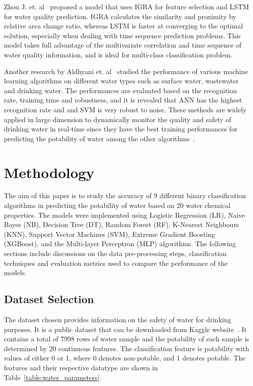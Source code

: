 \documentclass[conference]{IEEEtran}
\begin{document}
Zhou J. et. al~\cite{zhou2018water} proposed a model that uses IGRA for feature selection and LSTM for water quality prediction. IGRA calculates the similarity and proximity by relative area change ratio, whereas LSTM is faster at converging to the optimal solution, especially when dealing with time sequence prediction problems. This model takes full advantage of the multivariate correlation and time sequence of water quality information, and is ideal for multi-class classification problem. 

Another research by Aldhyani et. al~\cite{aldhyani2020water} studied the performance of various machine learning algorithms on different water types such as surface water, wastewater and drinking water. The performances are evaluated based on the recognition rate, training time and robustness, and it is revealed that ANN has the highest recognition rate and and SVM is very robust to noise. These methods are widely applied in large dimension to dynamically monitor the quality and safety of drinking water in real-time since they have the best training performances for predicting the potability of water among the other algorithms~\cite{bouamar2007evaluation}. 

\section{Methodology}
The aim of this paper is to study the accuracy of 9 different binary classification algorithms in predicting the potability of water based on 20 water chemical properties. The models were implemented using Logistic Regression (LR), Naive Bayes (NB), Decision Tree (DT), Random Forest (RF), K-Nearest Neighbours (KNN), Support Vector Machines (SVM), Extreme Gradient Boosting (XGBoost), and the Multi-layer Perceptron (MLP) algorithms. The following sections include discussions on the data pre-processing steps, classification techniques and evaluation metrics used to compare the performance of the models.
 
\subsection{Dataset Selection}
The dataset chosen provides information on the safety of water for drinking purposes. It is a public dataset that can be downloaded from Kaggle website~\cite{kaggledataset}. It contains a total of 7998 rows of water sample and the potability of each sample is determined by 20 continuous features. The classification feature is potability with values of either 0 or 1, where 0 denotes non-potable, and 1 denotes potable. The features and their respective datatype are shown in Table~\ref{table:water_parameters}. 
\end{document}
